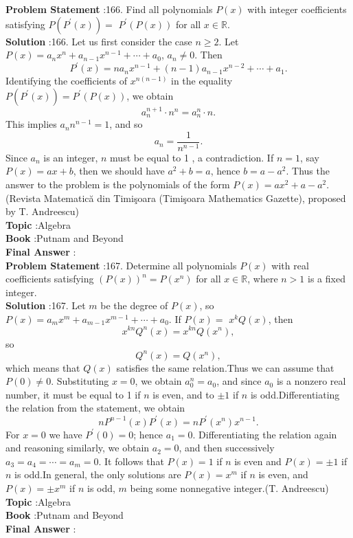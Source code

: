 \documentclass[10pt]{article}
\begin{document}
\textbf{Problem Statement} :166. Find all polynomials $P(x)$ with integer coefficients satisfying $P\left(P^{\prime}(x)\right)=$ $P^{\prime}(P(x))$ for all $x \in \mathbb{R}$.\\
\textbf{Solution} :166. Let us first consider the case $n \geq 2$. Let $P(x)=a_{n} x^{n}+a_{n-1} x^{n-1}+\cdots+a_{0}$, $a_{n} \neq 0$. Then$$ P^{\prime}(x)=n a_{n} x^{n-1}+(n-1) a_{n-1} x^{n-2}+\cdots+a_{1} . $$Identifying the coefficients of $x^{n(n-1)}$ in the equality $P\left(P^{\prime}(x)\right)=P^{\prime}(P(x))$, we obtain$$ a_{n}^{n+1} \cdot n^{n}=a_{n}^{n} \cdot n . $$This implies $a_{n} n^{n-1}=1$, and so$$ a_{n}=\frac{1}{n^{n-1}} . $$Since $a_{n}$ is an integer, $n$ must be equal to 1 , a contradiction. If $n=1$, say $P(x)=a x+b$, then we should have $a^{2}+b=a$, hence $b=a-a^{2}$. Thus the answer to the problem is the polynomials of the form $P(x)=a x^{2}+a-a^{2}$.(Revista Matematică din Timişoara (Timişoara Mathematics Gazette), proposed by T. Andreescu)\\
\textbf{Topic} :Algebra\\
\textbf{Book} :Putnam and Beyond\\
\textbf{Final Answer} :\\


\textbf{Problem Statement} :167. Determine all polynomials $P(x)$ with real coefficients satisfying $(P(x))^{n}=P\left(x^{n}\right)$ for all $x \in \mathbb{R}$, where $n>1$ is a fixed integer. \\
\textbf{Solution} :167. Let $m$ be the degree of $P(x)$, so $P(x)=a_{m} x^{m}+a_{m-1} x^{m-1}+\cdots+a_{0}$. If $P(x)=$ $x^{k} Q(x)$, then$$ x^{k n} Q^{n}(x)=x^{k n} Q\left(x^{n}\right), $$so$$ Q^{n}(x)=Q\left(x^{n}\right), $$which means that $Q(x)$ satisfies the same relation.Thus we can assume that $P(0) \neq 0$. Substituting $x=0$, we obtain $a_{0}^{n}=a_{0}$, and since $a_{0}$ is a nonzero real number, it must be equal to 1 if $n$ is even, and to $\pm 1$ if $n$ is odd.Differentiating the relation from the statement, we obtain$$ n P^{n-1}(x) P^{\prime}(x)=n P^{\prime}\left(x^{n}\right) x^{n-1} . $$For $x=0$ we have $P^{\prime}(0)=0$; hence $a_{1}=0$. Differentiating the relation again and reasoning similarly, we obtain $a_{2}=0$, and then successively $a_{3}=a_{4}=\cdots=a_{m}=0$. It follows that $P(x)=1$ if $n$ is even and $P(x)=\pm 1$ if $n$ is odd.In general, the only solutions are $P(x)=x^{m}$ if $n$ is even, and $P(x)=\pm x^{m}$ if $n$ is odd, $m$ being some nonnegative integer.(T. Andreescu) \\
\textbf{Topic} :Algebra\\
\textbf{Book} :Putnam and Beyond\\
\textbf{Final Answer} :\\
\end{document}
